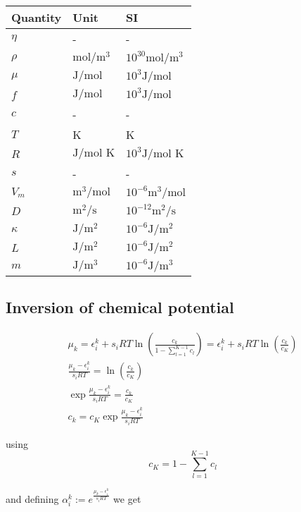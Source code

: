 \documentclass[11pt]{article}
\begin{document}
\begin{center}
\begin{tabular}{lll}
Quantity & Unit & SI\\[0pt]
\hline
\(\eta\) & - & -\\[0pt]
\(\rho\) & \(\text{mol}/\text{m}^3\) & \(10^{30} \text{mol}/\text{m}^3\)\\[0pt]
\(\mu\) & \(\text{J}/\text{mol}\) & \(10^3 \text{J}/\text{mol}\)\\[0pt]
\(f\) & \(\text{J}/\text{mol}\) & \(10^3 \text{J}/\text{mol}\)\\[0pt]
\(c\) & - & -\\[0pt]
\(T\) & K & K\\[0pt]
\(R\) & \(\text{J}/\text{mol K}\) & \(10^3 \text{J}/\text{mol K}\)\\[0pt]
\(s\) & - & -\\[0pt]
\(V_m\) & \(\text{m}^3/\text{mol}\) & \(10^{-6} \text{m}^3/\text{mol}\)\\[0pt]
\(D\) & \(\text{m}^2/\text{s}\) & \(10^{-12} \text{m}^2/\text{s}\)\\[0pt]
\(\kappa\) & \(\text{J}/\text{m}^2\) & \(10^{-6} \text{J}/\text{m}^2\)\\[0pt]
\(L\) & \(\text{J}/\text{m}^2\) & \(10^{-6} \text{J}/\text{m}^2\)\\[0pt]
\(m\) & \(\text{J}/\text{m}^3\) & \(10^{-6} \text{J}/\text{m}^3\)\\[0pt]
\end{tabular}
\end{center}


\subsection{Inversion of chemical potential}
\label{sec:orgc74b4cc}

\begin{align*}
\mu_k = \epsilon_i^k + s_i R T \ln{\left(\frac{c_k}{1-\sum_{l=1}^{K-1} c_l}\right)} = \epsilon_i^k + s_i R T \ln{\left(\frac{c_k}{c_K}\right)} \\
\frac{\mu_k - \epsilon_i^k}{s_i R T} = \ln{\left(\frac{c_k}{c_K}\right)} \\
\exp{\frac{\mu_k - \epsilon_i^k}{s_i R T}} = \frac{c_k}{c_K} \\
c_k = c_K \exp{\frac{\mu_k - \epsilon_i^k}{s_i R T}}
\end{align*}

using 
$$
c_K = 1 - \sum_{l=1}^{K-1} c_l
$$

and defining \(\alpha_i^k := e^{\frac{\mu_k - \epsilon_i^k}{s_i R T}}\) we get
\end{document}
